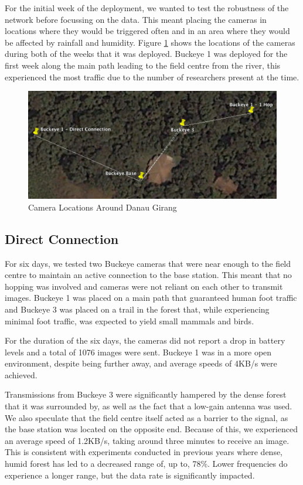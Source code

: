 		For the initial week of the deployment, we wanted to test the robustness of the network before focussing on the data. This meant placing the cameras in locations where they would be triggered often and in an area where they would be affected by rainfall and humidity. Figure \ref{cam_locs} shows the locations of the cameras during both of the weeks that it was deployed. Buckeye 1 was deployed for the first week along the main path leading to the field centre from the river, this experienced the most traffic due to the number of researchers present at the time. 
	
	    \begin{figure}[h]
	    \centering
		\includegraphics[width=\textwidth]{Chap6/figures/buckeye}
	    \caption{Camera Locations Around Danau Girang}
	    \label{cam_locs}
	    \end{figure}
	
		\subsection{Direct Connection}
		For six days, we tested two Buckeye cameras that were near enough to the field centre to maintain an active connection to the base station. This meant that no hopping was involved and cameras were not reliant on each other to transmit images. Buckeye 1 was placed on a main path that guaranteed human foot traffic and Buckeye 3 was placed on a trail in the forest that, while experiencing minimal foot traffic, was expected to yield small mammals and birds.
		
		For the duration of the six days, the cameras did not report a drop in battery levels and a total of 1076 images were sent. Buckeye 1 was in a more open environment, despite being further away, and average speeds of 4KB/s were achieved. 
		
		Transmissions from Buckeye 3 were significantly hampered by the dense forest that it was surrounded by, as well as the fact that a low-gain antenna was used. We also speculate that the field centre itself acted as a barrier to the signal, as the base station was located on the opposite end. Because of this, we experienced an average speed of 1.2KB/s, taking around three minutes to receive an image. This is consistent with experiments conducted in previous years where dense, humid forest has led to a decreased range of, up to, 78\%. Lower frequencies do experience a longer range, but the data rate is significantly impacted.
		
